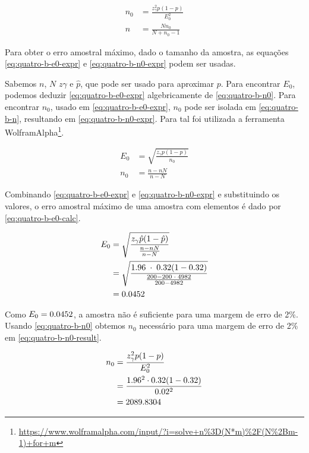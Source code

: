 	\begin{align}
		n_0 &= \label{eq:quatro-b-n0}
			   \frac{z_\gamma^2 p(1-p)}{E_0^2} \\
		n &= \label{eq:quatro-b-n}
			 \frac{N n_0}{N + n_0 - 1} 
	\end{align}

	Para obter o erro amostral máximo, dado o tamanho da amostra, as
	equações \eqref{eq:quatro-b-e0-expr} e \eqref{eq:quatro-b-n0-expr} podem
	ser usadas. 

	Sabemos $n$, $N$ $z\gamma$ e $\hat{p}$, que pode ser usado para
	aproximar $p$. Para encontrar $E_0$, podemos deduzir
	\eqref{eq:quatro-b-e0-expr} algebricamente de \eqref{eq:quatro-b-n0}.
	Para encontrar $n_0$, usado em \eqref{eq:quatro-b-e0-expr}, $n_0$ pode
	ser isolada em \eqref{eq:quatro-b-n}, resultando em
	\eqref{eq:quatro-b-n0-expr}. Para tal foi utilizada a ferramenta
	WolframAlpha\footnote{\url{https://www.wolframalpha.com/input/?i=solve+n\%3D(N*m)\%2F(N\%2Bm-1)+for+m}}.

	\begin{align}
		E_0 &= \label{eq:quatro-b-e0-expr}
			   \sqrt{\frac{z_\gamma p(1 - p) }{n_0}} \\
		n_0 &= \label{eq:quatro-b-n0-expr}
			   \frac{n-n N}{n-N}
	\end{align}

	Combinando \eqref{eq:quatro-b-e0-expr} e \eqref{eq:quatro-b-n0-expr} e
	substituindo os valores, o erro amostral máximo de uma amostra com
	\QUATROn elementos é dado por \eqref{eq:quatro-b-e0-calc}.

	\begin{align}
		\label{eq:quatro-b-e0-calc}
		E_0 &= \sqrt{\frac{z_\gamma \hat{p}(1 - \hat{p}) }{\frac{n-n N}{n - N}}} \\
			&= \sqrt{\frac{1.96 \;\cdot\; 0.32 (1 - 0.32) }{\frac{200 - 200 \;\cdot\; 4982}{200 - 4982}}} \nonumber \\
			&= 0.0452 \nonumber
	\end{align}

	Como $E_0 = 0.0452$, a amostra não é suficiente para uma margem de
	erro de 2\%. Usando \eqref{eq:quatro-b-n0} obtemos $n_0$ necessário para
	uma margem de erro de 2\% em \eqref{eq:quatro-b-n0-result}.

	\begin{align}
		n_0 &= \frac{z_\gamma^2 p(1-p)}{E_0^2} \nonumber \\
			&= \frac{1.96^2 \cdot 0.32(1-0.32)}{0.02^2} \nonumber \\
			&= \label{eq:quatro-b-n0-result}
			   2089.8304	
	\end{align}

